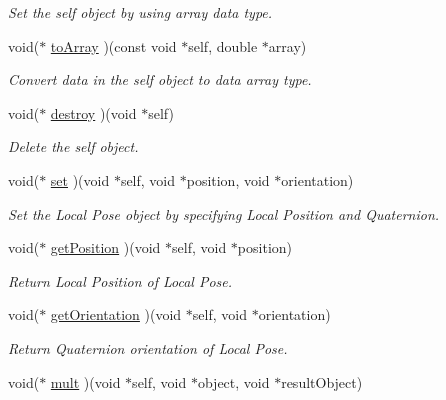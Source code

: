 \begin{CompactItemize}
\begin{CompactList}\small\item\em Set the self object by using array data type. \item\end{CompactList}\item 
void($\ast$ \hyperlink{structdrdc__lPose__t_896a70046179976efa52362a59ce54d2}{toArray} )(const void $\ast$self, double $\ast$array)
\begin{CompactList}\small\item\em Convert data in the self object to data array type. \item\end{CompactList}\item 
void($\ast$ \hyperlink{structdrdc__lPose__t_d9c56a71e8224d85bedbdbc468f73962}{destroy} )(void $\ast$self)
\begin{CompactList}\small\item\em Delete the self object. \item\end{CompactList}\item 
void($\ast$ \hyperlink{structdrdc__lPose__t_fcc32b888211dce06e5ae90747281555}{set} )(void $\ast$self, void $\ast$position, void $\ast$orientation)
\begin{CompactList}\small\item\em Set the Local Pose object by specifying Local Position and Quaternion. \item\end{CompactList}\item 
void($\ast$ \hyperlink{structdrdc__lPose__t_7ea061e1553a860eb7c5ccbe07846948}{getPosition} )(void $\ast$self, void $\ast$position)
\begin{CompactList}\small\item\em Return Local Position of Local Pose. \item\end{CompactList}\item 
void($\ast$ \hyperlink{structdrdc__lPose__t_0bd925f93db71c6a83c72ae286588d03}{getOrientation} )(void $\ast$self, void $\ast$orientation)
\begin{CompactList}\small\item\em Return Quaternion orientation of Local Pose. \item\end{CompactList}\item 
void($\ast$ \hyperlink{structdrdc__lPose__t_a6f487a1f79398f7f4ff149d9fc2d931}{mult} )(void $\ast$self, void $\ast$object, void $\ast$resultObject)

\end{CompactItemize}
